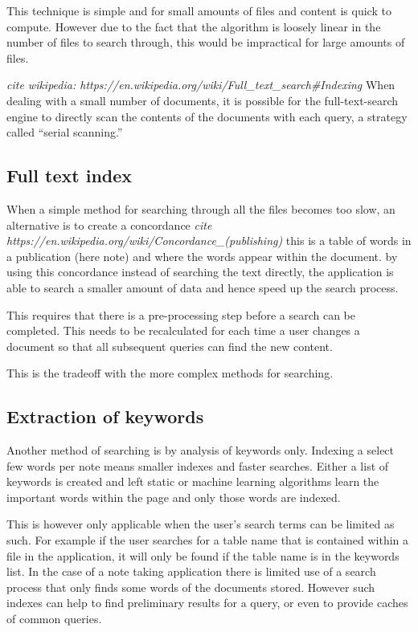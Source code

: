 This technique is simple and for small amounts of files and content is
quick to compute. However due to the fact that the algorithm is loosely
linear in the number of files to search through, this would be
impractical for large amounts of files.

\emph{cite wikipedia:
https://en.wikipedia.org/wiki/Full\_text\_search\#Indexing} When dealing
with a small number of documents, it is possible for the
full-text-search engine to directly scan the contents of the documents
with each query, a strategy called ``serial scanning.''

\subsection{Full text index}\label{full-text-index}

When a simple method for searching through all the files becomes too
slow, an alternative is to create a concordance \emph{cite
https://en.wikipedia.org/wiki/Concordance\_(publishing)} this is a table
of words in a publication (here note) and where the words appear within
the document. by using this concordance instead of searching the text
directly, the application is able to search a smaller amount of data and
hence speed up the search process.

This requires that there is a pre-processing step before a search can be
completed. This needs to be recalculated for each time a user changes a
document so that all subsequent queries can find the new content.

This is the tradeoff with the more complex methods for searching.

\subsection{Extraction of keywords}\label{extraction-of-keywords}

Another method of searching is by analysis of keywords only. Indexing a
select few words per note means smaller indexes and faster searches.
Either a list of keywords is created and left static or machine learning
algorithms learn the important words within the page and only those
words are indexed.

This is however only applicable when the user's search terms can be
limited as such. For example if the user searches for a table name that
is contained within a file in the application, it will only be found if
the table name is in the keywords list. In the case of a note taking
application there is limited use of a search process that only finds
some words of the documents stored. However such indexes can help to
find preliminary results for a query, or even to provide caches of
common queries.

